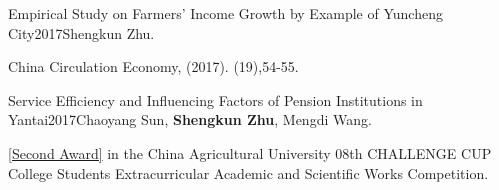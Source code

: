 \documentclass{joel_cv}
\begin{document}
\begin{enumerate}[label={[\arabic*]}]
	
	\item \begin{sectionContentNormal}{Empirical Study on Farmers' Income Growth by Example of Yuncheng City}{2017}{Shengkun Zhu.}
		\item China Circulation Economy, (2017). (19),54-55.
		\quad[\href{https://kns.cnki.net/kcms/detail/detail.aspx?dbcode=CJFD&dbname=CJFDLAST2017&filename=QGSQ201719028&uniplatform=NZKPT&v=IsduICfXGkpNfx1F_0K9u6eESoBSqhWDWF8tW_7gLvlD707-79CtCDU51kR-3Rqb}{Paper}]
	\end{sectionContentNormal}
	
	
	
	\item \begin{sectionContentNormal}{Service Efficiency and Influencing Factors of Pension Institutions in Yantai}{2017}{Chaoyang Sun, \textbf{Shengkun Zhu}, Mengdi Wang.}
		\item \href{https://zhu-sk.github.io/ChallengeCup.jpg}{[Second Award]} in the China Agricultural University 08th CHALLENGE CUP College Students Extracurricular Academic and Scientific Works Competition. 
	\end{sectionContentNormal}

\end{enumerate}



\end{document}
